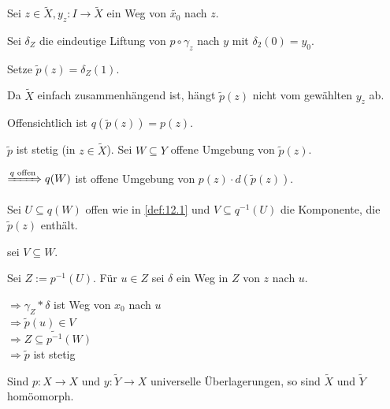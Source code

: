 \begin{beweis}
    Sei $z \in \tilde{X}, y_z: I \rightarrow \tilde{X}$ ein Weg von
    $\tilde{x_0}$ nach $z$.

    Sei $\delta_Z$ die eindeutige Liftung von $p \circ \gamma_z$
    nach $y$ mit $\delta_2(0) = y_0$.

    Setze $\tilde{p}(z) = \delta_Z(1)$.

    Da $\tilde{X}$ einfach zusammenhängend ist, hängt $\tilde{p}(z)$
    nicht vom gewählten $y_z$ ab.

    Offensichtlich ist $q(\tilde{p}(z)) = p(z)$.

    $\tilde{p}$ ist stetig (in $z \in \tilde{X}$). Sei $W \subseteq Y$
    offene Umgebung von $\tilde{p}(z)$.

    $\xRightarrow{q \text{ offen}} q(W)$ ist offene Umgebung von $p(z) \cdot d(\tilde{p}(z))$.

    Sei $U \subseteq q(W)$ offen wie in \cref{def:12.1} und
    $V \subseteq q^{-1}(U)$ die Komponente, die $\tilde{p}(z)$
    enthält.

    \Obda sei $V \subseteq W$.

    Sei $Z := p^{-1}(U)$. Für $u \in Z$ sei $\delta$ ein Weg in $Z$
    von $z$ nach $u$.

    $\Rightarrow \gamma_Z * \delta$ ist Weg von $x_0$ nach $u$\\
    $\Rightarrow \tilde{p}(u) \in V$\\
    $\Rightarrow Z \subseteq \tilde{p^{-1}}(W)$\\
    $\Rightarrow \tilde{p}$ ist stetig
\end{beweis}

\begin{bemerkung}%
    Sind $p:X \rightarrow X$ und $y: \tilde{Y} \rightarrow X$
    universelle Überlagerungen, so sind $\tilde{X}$ und $\tilde{Y}$
    homöomorph.
\end{bemerkung}

